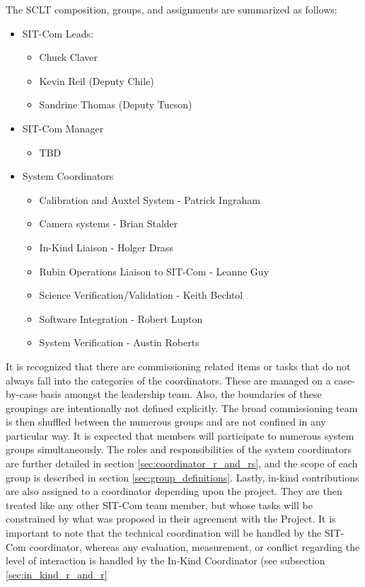 \documentclass[SE,lsstdraft,authoryear,toc]{lsstdoc}
\begin{document}
The SCLT composition, groups, and assignments are summarized as follows:
\begin{itemize}
    \item SIT-Com Leads:
    \begin{itemize}
        \item Chuck Claver
        \item Kevin Reil (Deputy Chile)
        \item Sandrine Thomas (Deputy Tucson)
    \end{itemize}
    \item SIT-Com Manager
    \begin{itemize}
        \item TBD
    \end{itemize}
    \item System Coordinators
    \begin{itemize}
        \item Calibration and Auxtel System - Patrick Ingraham
        \item Camera systems - Brian Stalder
        \item In-Kind Liaison - Holger Drass
        \item Rubin Operations Liaison to SIT-Com - Leanne Guy
        \item Science Verification/Validation - Keith Bechtol
        \item Software Integration - Robert Lupton
        \item System Verification - Austin Roberts
    \end{itemize}
\end{itemize}


It is recognized that there are commissioning related items or tasks that do not always fall into the categories of the coordinators.
These are managed on a case-by-case basis amongst the leadership team.
Also, the boundaries of these groupings are intentionally not defined explicitly.
The broad commissioning team is then shuffled between the numerous groups and are not confined in any particular way.
It is expected that members will participate to numerous system groups simultaneously.
The roles and responsibilities of the system coordinators are further detailed in section \ref{sec:coordinator_r_and_rs}, and the scope of each group is described in section \ref{sec:group_definitions}.
Lastly, in-kind contributions are also assigned to a coordinator depending upon the project.
They are then treated like any other SIT-Com team member, but whose tasks will be constrained by what was proposed in their agreement with the Project.
It is important to note that the technical coordination will be handled by the SIT-Com coordinator, whereas any evaluation, measurement, or conflict regarding the level of interaction is handled by the In-Kind Coordinator (see subsection \ref{sec:in_kind_r_and_r}
\end{document}
